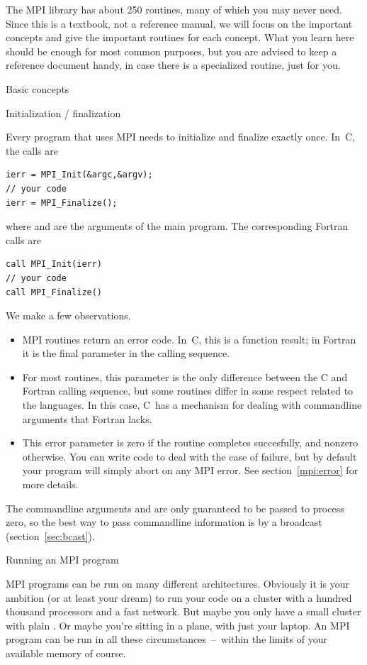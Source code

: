 The \acf{MPI} library has about 250 routines, many of which you may
never need. Since this is a textbook, not a reference manual, we will
focus on the important concepts and give the important routines for
each concept. What you learn here should be enough for most common
purposes, but you are advised to keep a reference document handy, in
case there is a specialized routine, just for you.

 {Basic concepts}

 {Initialization / finalization}

Every program that uses MPI needs to initialize and finalize exactly
once. In~C, the calls are
\begin{verbatim}
ierr = MPI_Init(&argc,&argv);
// your code
ierr = MPI_Finalize();
\end{verbatim}
where  and  are the arguments of the main program.
%
The corresponding Fortran calls are
\begin{verbatim}
call MPI_Init(ierr)
// your code
call MPI_Finalize()
\end{verbatim}

We make a few observations.
\begin{itemize}
\item MPI routines return an error code. In~C, this is a function
  result; in Fortran it is the final parameter in the calling
  sequence.
\item For most routines, this parameter is the only difference between
  the C and Fortran calling sequence, but some routines differ in some
  respect related to the languages. In this case, C~has a mechanism
  for dealing with commandline arguments that Fortran lacks.
\item This error parameter is zero if the routine completes
  succesfully, and nonzero otherwise. You can write code to deal with
  the case of failure, but by default your program will simply abort
  on any MPI error. See section~\ref{mpi:error} for more details.
\end{itemize}

The commandline arguments  and  are only guaranteed to
be passed to process zero, so the best way to pass commandline information
is by a broadcast (section~\ref{sec:bcast}).

 {Running an MPI program}

MPI programs can be run on many different architectures. Obviously it
is your ambition (or at least your dream) to run your code on a
cluster with a hundred thousand processors and a fast network. But
maybe you only have a small cluster with
plain . Or maybe you're sitting in a plane, with
just your laptop. An MPI program can be run in all these
circumstances~--~within the limits of your available memory of course.

